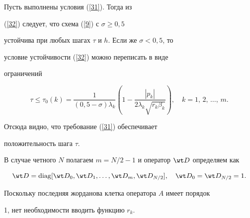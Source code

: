 \begin{notenonum}


Пусть выполнены условия (\ref{31}). Тогда из


(\ref{32}) следует, что схема (\ref{9}) с $\sigma \geqslant 0{,}5$


устойчива при любых шагах $\tau$ и $h$. Если же $\sigma < 0{,}5$, то


условие устойчивости (\ref{32}) можно переписать в виде


ограничений


$$


\tau \leqslant \tau_0 (k)=\frac{1} {{(0{,}5-\sigma)\lambda_k


}}\left({1-\frac{{\left| {p_k} \right|}} {{2\lambda_k \sqrt


{r_k \beta_k}}}} \right),\quad k=1,\,2,\, \dotsc,\,m.


$$


Отсюда видно, что требование (\ref{31}) обеспечивает


положительность шага $\tau $.


\end{notenonum}





В случае четного $N$ полагаем $m=N/2-1$ и оператор ${\wt


D}$ определяем как


\begin{equation}\label{34}


\wt D=\diag[ {\wt D_0,\wt D_1,\dotsc


,\wt D_m,\wt D_{N/2}}],\quad \wt D_0=\wt D_{N/2}=1.


\end{equation}


Поскольку последняя жорданова клетка оператора $A$ имеет порядок


1, нет необходимости вводить функцию $r_k $.





